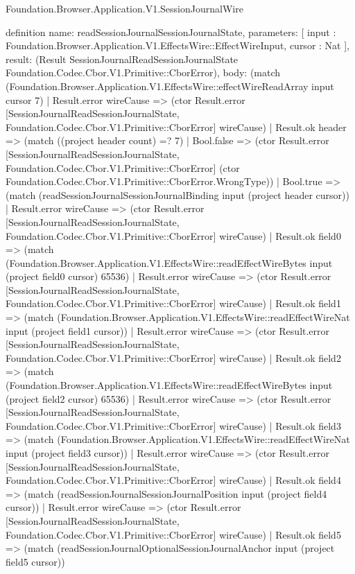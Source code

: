 \begin{lexlean}{Foundation.Browser.Application.V1.SessionJournalWire}
\begin{semanticmodule}
definition{
  name: readSessionJournalSessionJournalState,
  parameters: [
    input : Foundation.Browser.Application.V1.EffectsWire::EffectWireInput,
    cursor : Nat
  ],
  result: (Result SessionJournalReadSessionJournalState Foundation.Codec.Cbor.V1.Primitive::CborError),
  body: (match (Foundation.Browser.Application.V1.EffectsWire::effectWireReadArray input cursor 7)
    | Result.error wireCause => (ctor Result.error [SessionJournalReadSessionJournalState, Foundation.Codec.Cbor.V1.Primitive::CborError] wireCause)
    | Result.ok header => (match ((project header count) =? 7)
      | Bool.false => (ctor Result.error [SessionJournalReadSessionJournalState, Foundation.Codec.Cbor.V1.Primitive::CborError] (ctor Foundation.Codec.Cbor.V1.Primitive::CborError.WrongType))
      | Bool.true => (match (readSessionJournalSessionJournalBinding input (project header cursor))
        | Result.error wireCause => (ctor Result.error [SessionJournalReadSessionJournalState, Foundation.Codec.Cbor.V1.Primitive::CborError] wireCause)
        | Result.ok field0 => (match (Foundation.Browser.Application.V1.EffectsWire::readEffectWireBytes input (project field0 cursor) 65536)
          | Result.error wireCause => (ctor Result.error [SessionJournalReadSessionJournalState, Foundation.Codec.Cbor.V1.Primitive::CborError] wireCause)
          | Result.ok field1 => (match (Foundation.Browser.Application.V1.EffectsWire::readEffectWireNat input (project field1 cursor))
            | Result.error wireCause => (ctor Result.error [SessionJournalReadSessionJournalState, Foundation.Codec.Cbor.V1.Primitive::CborError] wireCause)
            | Result.ok field2 => (match (Foundation.Browser.Application.V1.EffectsWire::readEffectWireBytes input (project field2 cursor) 65536)
              | Result.error wireCause => (ctor Result.error [SessionJournalReadSessionJournalState, Foundation.Codec.Cbor.V1.Primitive::CborError] wireCause)
              | Result.ok field3 => (match (Foundation.Browser.Application.V1.EffectsWire::readEffectWireNat input (project field3 cursor))
                | Result.error wireCause => (ctor Result.error [SessionJournalReadSessionJournalState, Foundation.Codec.Cbor.V1.Primitive::CborError] wireCause)
                | Result.ok field4 => (match (readSessionJournalSessionJournalPosition input (project field4 cursor))
                  | Result.error wireCause => (ctor Result.error [SessionJournalReadSessionJournalState, Foundation.Codec.Cbor.V1.Primitive::CborError] wireCause)
                  | Result.ok field5 => (match (readSessionJournalOptionalSessionJournalAnchor input (project field5 cursor))
}
\end{semanticmodule}
\end{lexlean}
